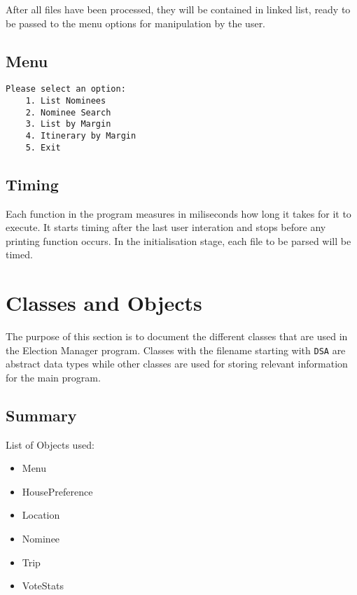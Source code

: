 \documentclass[a4paper, 12pt, titlepage]{article}
\newcommand{\code}[1]{\small\texttt{#1}\normalsize}
\begin{document}
After all files have been processed, they will be contained in linked list,
ready to be passed to the menu options for manipulation by the user.

\subsection{Menu}

\begin{lstlisting}
Please select an option:
    1. List Nominees
    2. Nominee Search
    3. List by Margin
    4. Itinerary by Margin
    5. Exit
\end{lstlisting}

\subsection{Timing}

Each function in the program measures in miliseconds how long it takes
for it to execute. It starts timing after the last user interation and
stops before any printing function occurs. In the initialisation stage,
each file to be parsed will be timed.

\newpage

\section{Classes and Objects}

The purpose of this section is to document the different classes that are used
in the Election Manager program. Classes with the filename starting with
\code{DSA} are abstract data types while other classes are used for storing
relevant information for the main program.

\subsection{Summary}

List of Objects used:
\begin{itemize}[label={--}]
    \item Menu
    \item HousePreference
    \item Location
    \item Nominee
    \item Trip
    \item VoteStats
\end{itemize}
\end{document}

